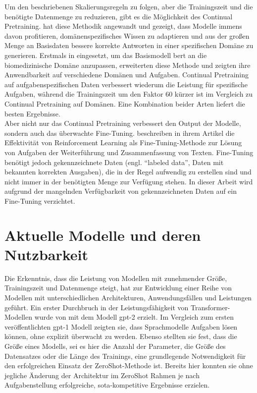 Um den beschriebenen Skalierungsregeln zu folgen, aber die Trainingszeit und die benötigte Datenmenge zu reduzieren, gibt es die Möglichkeit des Continual Pretraining. 
\citet{dont_stop_pretraining} hat diese Methodik angewandt und gezeigt, dass Modelle immens davon profitieren, domänenspezifisches Wissen zu adaptieren und aus der großen Menge an Basisdaten bessere korrekte Antworten in einer spezifischen Domäne zu generieren. 
Erstmals in \citet{biobert} eingesetzt, um das Basismodell \ac{bert} an die biomedizinische Domäne anzupassen, erweiterten \citet{dont_stop_pretraining} diese Methode und zeigten ihre Anwendbarkeit auf verschiedene Domänen und Aufgaben. 
Continual Pretraining auf aufgabenspezifischen Daten verbessert wiederum die Leistung für spezifische Aufgaben, während die Trainingszeit um den Faktor 60 kürzer ist im Vergleich zu Continual Pretraining auf Domänen. 
Eine Kombination beider Arten liefert die besten Ergebnisse.\\

Aber nicht nur das Continual Pretraining verbessert den Output der Modelle, sondern auch das überwachte Fine-Tuning. 
\citet{finetuning} beschreiben in ihrem Artikel die Effektivität von Reinforcement Learning als Fine-Tuning-Methode zur Lösung von Aufgaben der Weiterführung und Zusammenfassung von Texten. 
Fine-Tuning benötigt jedoch gekennzeichnete Daten (engl. \enquote{labeled data}, Daten mit bekannten korrekten Ausgaben), die in der Regel aufwendig zu erstellen sind und nicht immer in der benötigten Menge zur Verfügung stehen. 
In dieser Arbeit wird aufgrund der mangelnden Verfügbarkeit von gekennzeichneten Daten auf ein Fine-Tuning verzichtet.\\

\section{Aktuelle Modelle und deren Nutzbarkeit}

Die Erkenntnis, dass die Leistung von Modellen mit zunehmender Größe, Trainingszeit und Datenmenge steigt, hat zur Entwicklung einer Reihe von Modellen mit unterschiedlichen Architekturen, Anwendungsfällen und Leistungen geführt.
Ein erster Durchbruch in der Leistungsfähigkeit von Transformer-Modellen wurde von \citet{gpt2} mit dem Modell \ac{gpt}-2 erzielt.
Im Vergleich zum ersten veröffentlichten \ac{gpt}-1 Modell \citep{gpt1} zeigten sie, dass Sprachmodelle Aufgaben lösen können, ohne explizit überwacht zu werden.
Ebenso stellten sie fest, dass die Größe eines Modells, sei es hier die Anzahl der Parameter, die Größe des Datensatzes oder die Länge des Trainings, eine grundlegende Notwendigkeit für den erfolgreichen Einsatz der ZeroShot-Methode ist.
Bereits hier konnten sie ohne jegliche Änderung der Architektur im ZeroShot Rahmen je nach Aufgabenstellung erfolgreiche, \ac{sota}-kompetitive Ergebnisse erzielen.\\

